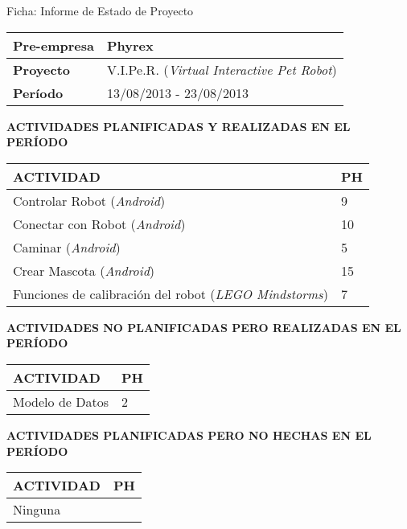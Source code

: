 \documentclass[10pt,letter]{article}
\begin{document}
\vspace{4cm}
\begin{center}
  {\huge Ficha: Informe de Estado de Proyecto}
\end{center}

\vspace{-0,2cm}
\begin{table}[H]
\centering
  \begin{tabular}{|p{3cm}|p{12cm}|}\hline
    {\bf Pre-empresa} & Phyrex \\ \hline
    {\bf Proyecto} & V.I.Pe.R. (\emph{Virtual Interactive Pet Robot}) \\ \hline
    {\bf Per\'iodo} & 13/08/2013 - 23/08/2013 \\\hline
  \end{tabular}
\end{table}

\vspace{0,5cm}
{\bf ACTIVIDADES PLANIFICADAS Y REALIZADAS EN EL PER\'IODO}
\begin{table}[H]
\centering
  \begin{tabular}{|p{12cm}|p{3cm}|}\hline
    {\bf ACTIVIDAD} & {\bf PH} \\ \hline
    Controlar Robot (\emph{Android})    & 9 \\\hline
    Conectar con Robot (\emph{Android}) & 10 \\\hline
    Caminar (\emph{Android})            & 5\\\hline
    Crear Mascota (\emph{Android})      & 15\\\hline
    Funciones de calibraci\'on del robot (\emph{LEGO Mindstorms}) & 7 \\ \hline
  \end{tabular}
\end{table}

\vspace{0,5cm}
{\bf ACTIVIDADES NO PLANIFICADAS PERO REALIZADAS EN EL PER\'IODO}
\begin{table}[H]
\centering
  \begin{tabular}{|p{12cm}|p{3cm}|}\hline
    {\bf ACTIVIDAD} & {\bf PH} \\ \hline
    Modelo de Datos & 2 \\\hline
  \end{tabular}
\end{table}

\vspace{0,5cm}
{\bf ACTIVIDADES PLANIFICADAS PERO NO HECHAS EN EL PER\'IODO}
\begin{table}[H]
\centering
  \begin{tabular}{|p{12cm}|p{3cm}|}\hline
    {\bf ACTIVIDAD} & {\bf PH} \\ \hline
    Ninguna & \\\hline
  \end{tabular}
\end{table}
\end{document}
